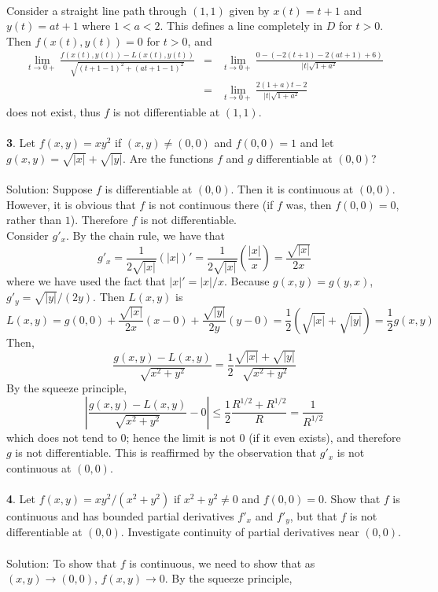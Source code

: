 \documentclass[12pt]{amsbook}
\begin{document}
\\
Consider a straight line path through $(1,1)$ given by $x(t)=t+1$ and $y(t)=at+1$ where $1<a<2$. This defines a line completely in $D$ for $t>0$. Then $f(x(t),y(t))=0$ for $t>0$, and
\begin{eqnarray*}
\lim_{t \rightarrow 0+} \frac{f(x(t),y(t))-L(x(t),y(t))}{\sqrt{(t+1-1)^2+(at+1-1)^2}}&=&\lim_{t \rightarrow 0+} \frac{0-(-2(t+1)-2(at+1)+6)}{|t|\sqrt{1+a^2}} \\
&=&\lim_{t \rightarrow 0+} \frac{2(1+a)t-2}{|t|\sqrt{1+a^2}}
\end{eqnarray*}
does not exist, thus $f$ is not differentiable at $(1,1)$.
\\
\\
{\small\bf 3}. Let $f(x,y)=xy^2$ if $(x,y) \neq (0,0)$ and $f(0,0)=1$ and let $g(x,y)=\sqrt{|x|}+\sqrt{|y|}$. Are the functions $f$ and $g$ differentiable at $(0, 0)$?
\\
\\
{\sc Solution}: Suppose $f$ is differentiable at $(0,0)$. Then it is continuous at $(0,0)$. However, it is obvious that $f$ is not continuous there (if $f$ was, then $f(0,0)=0$, rather than $1$). Therefore $f$ is not differentiable. 
\\
Consider $g'_x$. By the chain rule, we have that
$$g'_x=\frac{1}{2\sqrt{|x|}}(|x|)'=\frac{1}{2\sqrt{|x|}}(\frac{|x|}{x})=\frac{\sqrt{|x|}}{2x}$$
where we have used the fact that $|x|'=|x|/x$. Because $g(x,y)=g(y,x)$, $g'_y=\sqrt{|y|}/(2y)$. Then $L(x,y)$ is
$$L(x,y)=g(0,0)+\frac{\sqrt{|x|}}{2x}(x-0)+\frac{\sqrt{|y|}}{2y}(y-0)=\frac{1}{2}(\sqrt{|x|}+\sqrt{|y|})=\frac{1}{2}g(x,y)$$
Then,
$$\frac{g(x,y)-L(x,y)}{\sqrt{x^2+y^2}}=\frac{1}{2}\frac{\sqrt{|x|}+\sqrt{|y|}}{\sqrt{x^2+y^2}}$$
By the squeeze principle,
$$|\frac{g(x,y)-L(x,y)}{\sqrt{x^2+y^2}}-0|\leq \frac{1}{2}\frac{R^{1/2}+R^{1/2}}{R}=\frac{1}{R^{1/2}}$$
which does not tend to $0$; hence the limit is not $0$ (if it even exists), and therefore $g$ is not differentiable. This is reaffirmed by the observation that $g'_x$ is not continuous at $(0,0)$.
\\
\\
{\small\bf 4}. Let $f(x,y)=xy^2/(x^2+y^2)$ if $x^2+y^2 \neq 0$ and $f(0,0)=0$. Show that $f$
is continuous and has bounded partial derivatives $f'_x$ and $f'_y$, but that $f$ is
not differentiable at $(0, 0)$. Investigate continuity of partial derivatives near
$(0, 0)$.
\\
\\
{\sc Solution}: To show that $f$ is continuous, we need to show that as $(x,y) \rightarrow (0,0)$, $f(x,y) \rightarrow 0$. By the squeeze principle,
\end{document}
